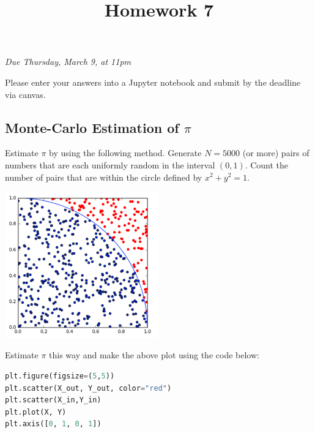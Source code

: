 \documentclass[letterpaper,11pt]{amsart}
\title{Homework 7}
\date{}
\theoremstyle{plain}
\theoremstyle{definition}
\begin{document}
\maketitle
\begin{center}
  \emph{Due Thursday, March 9, at 11pm}
  \vspace{0.3in}
  \end{center}


\noindent Please enter your answers into a Jupyter notebook and submit by the deadline via canvas. 

\subsection*{Monte-Carlo Estimation of $\pi$} Estimate $\pi$ by using the following method. Generate $N = 5000$ (or more) pairs of numbers that are each uniformly random in the interval $(0,1)$. Count the number of pairs that are within the circle defined by $x^2 + y^2 = 1$.
\begin{center}
\noindent\includegraphics[width=2.6in]{monte_carlo.png}
\end{center}
Estimate $\pi$ this way and make the above plot using the code below:

\begin{lstlisting}[language=Python]
plt.figure(figsize=(5,5))
plt.scatter(X_out, Y_out, color="red")
plt.scatter(X_in,Y_in)
plt.plot(X, Y)
plt.axis([0, 1, 0, 1])
\end{lstlisting}
\end{document}
